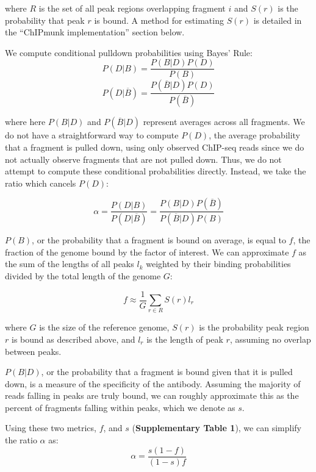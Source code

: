 \documentclass[12pt]{article}
\begin{document}
where $R$ is the set of all peak regions overlapping fragment $i$ and $S(r)$ is the probability that peak $r$ is bound. A method for estimating $S(r)$ is detailed in the ``ChIPmunk implementation'' section below.

We compute conditional pulldown probabilities using Bayes' Rule:
\begin{equation}
  P(D|B) = \frac{P(B|D)P(D)}{P(B)}
\end{equation}
\begin{equation}
  P(D|\overline{B}) = \frac{P(\overline{B}|D)P(D)}{P(\overline{B})}
\end{equation}

where here $P(B|D)$ and $P(\overline{B}|D)$ represent averages across all fragments.
We do not have a straightforward way to compute $P(D)$, the average probability that a fragment is pulled down, using only observed ChIP-seq reads since we do not actually observe fragments that are not pulled down.
Thus, we do not attempt to compute these conditional probabilities directly.
Instead, we take the ratio which cancels $P(D)$:

\begin{equation}
\alpha = \frac{P(D|B)}{P(D|\overline{B})} = \frac{P(B|D)P(\overline{B})}{P(\overline{B}|D)P(B)}
\end{equation}

$P(B)$, or the probability that a fragment is bound on average, is equal to $f$, the fraction of the genome bound by the factor of interest.
We can approximate $f$ as the sum of the lengths of all peaks $l_k$ weighted by their binding probabilities divided by the total length of the genome $G$:

\begin{equation}
  f \approx \frac{1}{G} \sum_{r \in R} S(r)l_r
\end{equation}

where $G$ is the size of the reference genome, $S(r)$ is the probability peak region $r$ is bound as described above, and $l_r$ is the length of peak $r$, assuming no overlap between peaks. 

$P(B|D)$, or the probability that a fragment is bound given that it is pulled down, is a measure of the specificity of the antibody. Assuming the majority of reads falling in peaks are truly bound, we can roughly approximate this as the percent of fragments falling within peaks, which we denote as $s$.

Using these two metrics, $f$, and $s$ (\textbf{Supplementary Table 1}), we can simplify the ratio $\alpha$ as:
\begin{equation} \label{eq:ratiosimple}
  \alpha = \frac{s(1-f)}{(1-s)f}
\end{equation}
\end{document}
